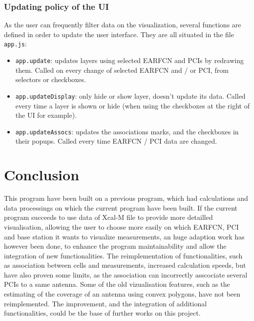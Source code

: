 \documentclass[a4paper, 11pt]{report}
\begin{document}
    \subsubsection{Updating policy of the UI}
    As the user can frequently filter data on the visualization, several functions are defined in order to update the user interface.
    They are all situated in the file \texttt{app.js}:

    \begin{itemize}
        \item \texttt{app.update}: updates layers using selected EARFCN and PCIs by redrawing them. Called on
        every change of selected EARFCN and / or PCI, from selectors or checkboxes.
        \item \texttt{app.updateDisplay}: only hide or show layer, doesn't update its data.
        Called every time a layer is shown or hide (when using the checkboxes at the right of the UI for example).
        \item \texttt{app.updateAssocs}: updates the associations marks, and the checkboxes in their popups. Called every time EARFCN / PCI data are changed.
    \end{itemize}
    
    \section{Conclusion}
    This program have been built on a previous program, which had calculations and data processings on which the current program have been built. If the current program succeeds to use data of Xcal-M file to provide more detailled visualisation, allowing the user to choose more easily on which EARFCN, PCI and base station it wants to visualize measurements, an huge adaption work has however been done, to enhance the program maintainability and allow the integration of new functionalities. The reimplementation of functionalities, such as association between cells and measurements, increased calculation speeds, but have also proven some limits, as the association can incorrectly asscociate several PCIs to a same antenna. Some of the old vizualisation features, such as the estimating of the coverage of an antenna using convex polygons, have not been reimplemented. The improvement, and the integration of additional functionalities, could be the base of further works on this project.
    
    \printbibliography
    
\end{document}
